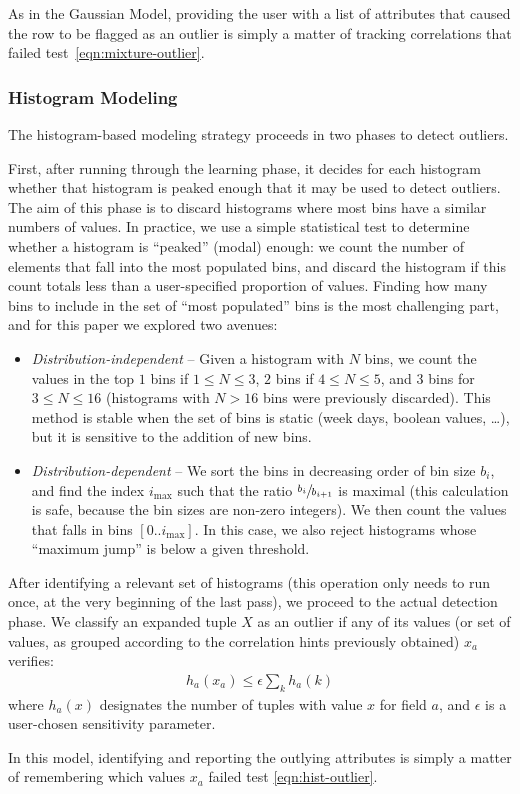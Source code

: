 As in the Gaussian Model, providing the user with a list of attributes that caused the row to be flagged as an outlier is simply a matter of tracking correlations that failed test~\ref{eqn:mixture-outlier}.

\subsubsection{Histogram Modeling}
The histogram-based modeling strategy proceeds in two phases to detect outliers.

First, after running through the learning phase, it decides for each histogram whether that histogram is peaked enough that it may be used to detect outliers. The aim of this phase is to discard histograms where most bins have a similar numbers of values. In practice, we use a simple statistical test to determine whether a histogram is ``peaked'' (modal) enough: we count the number of elements that fall into the most populated bins, and discard the histogram if this count totals less than a user-specified proportion of values. Finding how many bins to include in the set of ``most populated'' bins is the most challenging part, and for this paper we explored two avenues:

\begin{itemize}
\item \emph{Distribution-independent} -- Given a histogram with $N$ bins, we count the values in the top $1$ bins if $1 \leq N \leq 3$, $2$ bins if $4 \leq N \leq 5$, and $3$ bins for $3 \leq N \leq 16$ (histograms with $N > 16$ bins were previously discarded). This method is stable when the set of bins is static (week days, boolean values, \ldots), but it is sensitive to the addition of new bins.
\item \emph{Distribution-dependent} -- We sort the bins in decreasing order of bin size $b_i$, and find the index $i_{\max}$ such that the ratio $\sfrac{b_i}{b_{i+1}}$ is maximal (this calculation is safe, because the bin sizes are non-zero integers). We then count the values that falls in bins $[0 .. i_{\max}]$. In this case, we also reject histograms whose ``maximum jump'' is below a given threshold.
\end{itemize}

After identifying a relevant set of histograms (this operation only needs to run once, at the very beginning of the last pass), we proceed to the actual detection phase. We classify an expanded tuple $X$ as an outlier if any of its values (or set of values, as grouped according to the correlation hints previously obtained) $x_a$ verifies:
\begin{align}
h_a(x_a) \le \epsilon \sum_k h_a(k)
\label{eqn:hist-outlier}
\end{align}
where $h_a(x)$ designates the number of tuples with value $x$ for field $a$, and $\epsilon$ is a user-chosen sensitivity parameter.

In this model, identifying and reporting the outlying attributes is simply a matter of remembering which values $x_a$ failed test \ref{eqn:hist-outlier}.
